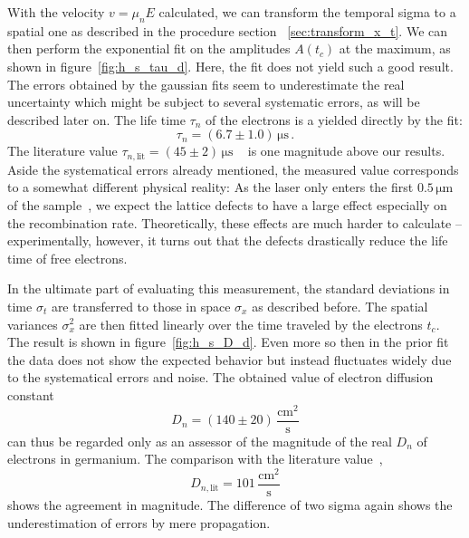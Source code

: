 With the velocity $v = \mu_n E$ calculated, we can transform 
the temporal sigma to a spatial one as described in the procedure section~%
\ref{sec:transform_x_t}. We can then perform the exponential fit on 
the amplitudes $A(t_c)$ at the maximum, as shown in figure~\ref{fig:h_s_tau_d}.
Here, the fit does not yield such a good result. The errors obtained 
by the gaussian fits seem to underestimate the real uncertainty 
which might be subject to several systematic errors, as will be described later on. 
The life time $\tau_n$ of the electrons is a yielded directly by the fit:
\begin{equation}
    \tau_n = (6.7 \pm 1.0)\, \mathrm{\mu s} \, .
\end{equation}
The literature value $\tau_{n, \mathrm{lit}} = (45 \pm 2)\, \mathrm{\mu s}$%
~\cite{staatsexamen}
is one magnitude above our results. Aside the systematical errors already 
mentioned, the measured value corresponds to a somewhat different 
physical reality: As the laser only enters the first $0.5 \, \mathrm{\mu m}$
of the sample~\cite{staatsexamen}, we expect the lattice defects to have 
a large effect especially on the recombination rate. Theoretically, 
these effects are much harder to calculate -- experimentally, however, 
it turns out that the defects drastically reduce the life time of free electrons. 

In the ultimate part of evaluating this measurement, the standard deviations in 
time $\sigma_t$ are transferred to those in space $\sigma_x$ as described before. 
The spatial variances $\sigma_x^2$ are then fitted linearly over the time 
traveled by the electrons $t_c$. The result is shown in figure~\ref{fig:h_s_D_d}.
Even more so then in the prior fit the data does not show the expected behavior 
but instead fluctuates widely due to the systematical errors and noise. 
The obtained value of electron diffusion constant 
\begin{equation}
    D_n = (140 \pm 20)\, \mathrm{\frac{cm^2}{s}} 
\end{equation}
can thus be regarded only as an assessor of the magnitude of the real $D_n$ 
of electrons in germanium. The comparison with the literature value~\cite{staatsexamen}, 
\begin{equation}
    D_{n, \mathrm{lit}} = 101\, \mathrm{\frac{cm^2}{s}}
\end{equation}
shows the agreement in magnitude. The difference of two sigma again shows the 
underestimation of errors by mere propagation. 

